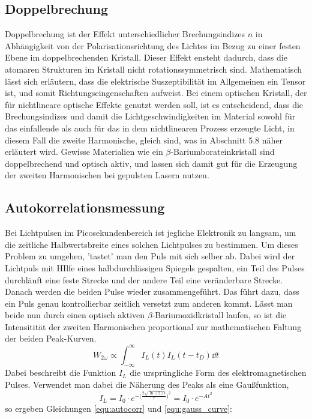 \subsection{Doppelbrechung}
Doppelbrechung ist der Effekt unterschiedlicher Brechungsindizes $n$ in Abhängigkeit von
der Polarisationsrichtung des Lichtes im Bezug zu einer festen Ebene im doppelbrechenden Kristall. Dieser Effekt ensteht dadurch, dass die atomaren Strukturen im Kristall nicht rotationssymmetrisch sind. Mathematisch
lässt sich erläutern, dass die elektrische Suszeptibilität im Allgemeinen ein Tensor ist, und somit Richtungseingenschaften aufweist. 
Bei einem optischen Kristall, der für nichtlineare optische Effekte genutzt werden soll, ist es entscheidend, dass die Brechungsindizes und damit die Lichtgeschwindigkeiten
im Material sowohl für das einfallende als auch für das in dem nichtlinearen Prozess erzeugte Licht, in diesem Fall die zweite Harmonische, gleich sind, was in Abschnitt 5.8 näher erläutert wird.
Gewisse Materialien wie ein $\beta$-Bariumborateinkristall sind doppelbrechend und optisch aktiv,
und lassen sich damit gut für die Erzeugung der zweiten Harmonischen bei gepulsten Lasern nutzen.

\subsection{Autokorrelationsmessung}
Bei Lichtpulsen im Picosekundenbereich ist jegliche Elektronik zu langsam, um die zeitliche Halbwertsbreite
eines solchen Lichtpulses zu bestimmen. Um dieses Problem zu umgehen, 'tastet' man den Puls mit sich selber ab.
Dabei wird der Lichtpuls mit HIlfe eines halbdurchlässigen Spiegels gespalten, ein Teil des Pulses durchläuft eine feste Strecke und der andere Teil eine veränderbare Strecke. Danach werden die beiden Pulse wieder zusammengeführt.
Das führt dazu, dass ein Puls genau kontrollierbar zeitlich versetzt zum anderen kommt.
Lässt man beide nun durch einen optisch aktiven $\beta$-Bariumoxidkristall laufen, so ist die Intensitität der zweiten Harmonischen proportional zur mathematischen Faltung der beiden Peak-Kurven.
\begin{equation}
  W_{2\omega} \propto \int_{-\infty}^{\infty}{I_L(t)I_L(t-t_D)\dd{t}}
  \label{equ:autocorr}
\end{equation}
Dabei beschreibt die Funktion $I_L$ die ursprüngliche Form des elektromagnetischen Pulses.
Verwendet man dabei die Näherung des Peaks als eine Gaußfunktion,
\begin{equation}
  I_L = I_0 \cdot e^{-\big(\frac{2\sqrt{\ln(2)}t}{\tau}\big)^2} = I_0 \cdot e^{-At^2}
  \label{equ:gauss_curve}
\end{equation}
so ergeben Gleichungen \ref{equ:autocorr} und \ref{equ:gauss_curve}:

